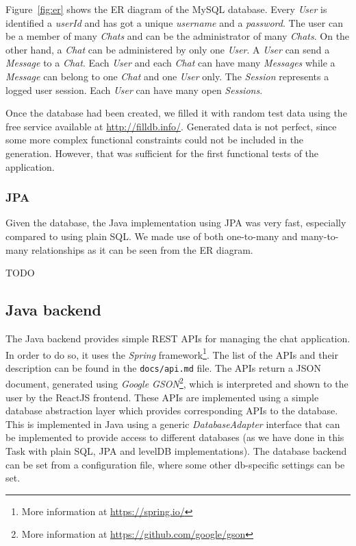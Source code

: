 \documentclass[10pt]{article}
\begin{document}
Figure~\ref{fig:er} shows the ER diagram of the MySQL database. Every \emph{User} 
is identified a \emph{userId} and has got a unique \emph{username} and a 
\emph{password}. The user can be a member of many \emph{Chats} and can 
be the administrator of many \emph{Chats}. On the other hand, a \emph{Chat} 
can be administered by only one \emph{User}. A \emph{User} can send a 
\emph{Message} to a \emph{Chat}. Each \emph{User} and each \emph{Chat} can 
have many \emph{Messages} while a \emph{Message} can belong to one \emph{Chat}
and one \emph{User} only. The \emph{Session} represents a logged user session.
Each \emph{User} can have many open \emph{Sessions}.

Once the database had been created, we filled it with random test data using the free
service available at \url{http://filldb.info/}. Generated data is not perfect, 
since some more complex functional constraints could not be included in the 
generation. However, that was sufficient for the first functional tests of the
application.

\subsubsection{JPA}
Given the database, the Java implementation using JPA was very fast, especially
compared to using plain SQL. We made use of both one-to-many and many-to-many 
relationships as it can be seen from the ER diagram.

TODO

\subsection{Java backend}
The Java backend provides simple REST APIs for managing the chat application. 
In order to do so, it uses the \emph{Spring} framework\footnote{More information
at \url{https://spring.io/}}.
The list of the APIs and their description can be found in the 
\texttt{docs/api.md} file. The APIs return a JSON document, generated using
\emph{Google GSON}\footnote{More information at 
\url{https://github.com/google/gson}}, which is interpreted and shown to the user
by the ReactJS frontend.
These APIs are implemented using a simple database abstraction layer which provides 
corresponding APIs to the database. This is implemented in Java 
using a generic \emph{DatabaseAdapter} interface that can be implemented to 
provide access to different databases (as we have done in this Task with plain SQL, 
JPA and levelDB implementations). The database backend can be set from a configuration
file, where some other db-specific settings can be set.
\end{document}
